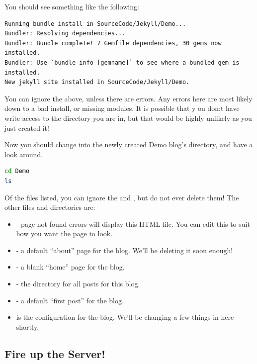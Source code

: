 You should see something like the following:

\begin{lstlisting}[style=myText]
Running bundle install in SourceCode/Jekyll/Demo...
Bundler: Resolving dependencies...
Bundler: Bundle complete! 7 Gemfile dependencies, 30 gems now installed.
Bundler: Use `bundle info [gemname]` to see where a bundled gem is installed.
New jekyll site installed in SourceCode/Jekyll/Demo.
\end{lstlisting}

You can ignore the above, unless there are errors. Any errors here are most likely down to a bad install, or missing modules. It is possible that y ou don;t have write access to the directory you are in, but that would be highly unlikely as you just created it!

Now you should change into the newly created Demo blog's directory, and have a look around.

\begin{lstlisting}[style=myStyle,language=bash]
cd Demo
ls
\end{lstlisting}

Of the files listed, you can ignore the  and , but do not ever delete them! The other files and directories are:

\begin{itemize}
    \item {} - page not found errors will display this HTML file. You can edit this to suit how you want the page to look.
    \item {} - a default ``about'' page for the blog. We'll be deleting it soon enough!
    \item {} - a blank ``home'' page for the blog.
    \item {} - the directory for all posts for this blog.
    \item {} - a default ``first post'' for the blog.
    \item {} is the configuration for the blog. We'll be changing a few things in here shortly.
\end{itemize}

\subsection{Fire up the Server!}\label{sect: Fir up the Server}

